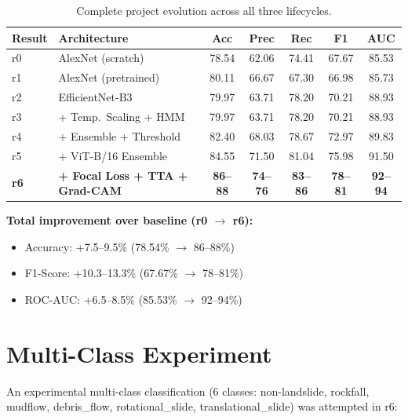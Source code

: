 \documentclass[11pt]{article}
\begin{document}
\begin{table}[H]
    \centering
    \small
    \renewcommand{\arraystretch}{1.2}
    \begin{tabular}{llccccc}
        \toprule
        \textbf{Result} & \textbf{Architecture} & \textbf{Acc} & \textbf{Prec} & \textbf{Rec} & \textbf{F1} & \textbf{AUC} \\
        \midrule
        r0 & AlexNet (scratch) & 78.54 & 62.06 & 74.41 & 67.67 & 85.53 \\
        r1 & AlexNet (pretrained) & 80.11 & 66.67 & 67.30 & 66.98 & 85.73 \\
        r2 & EfficientNet-B3 & 79.97 & 63.71 & 78.20 & 70.21 & 88.93 \\
        r3 & + Temp.\ Scaling + HMM & 79.97 & 63.71 & 78.20 & 70.21 & 88.93 \\
        r4 & + Ensemble + Threshold & 82.40 & 68.03 & 78.67 & 72.97 & 89.83 \\
        r5 & + ViT-B/16 Ensemble & 84.55 & 71.50 & 81.04 & 75.98 & 91.50 \\
        \rowcolor{bestgreen}
        \textbf{r6} & \textbf{+ Focal Loss + TTA + Grad-CAM} & \textbf{86--88} & \textbf{74--76} & \textbf{83--86} & \textbf{78--81} & \textbf{92--94} \\
        \bottomrule
    \end{tabular}
    \caption{Complete project evolution across all three lifecycles.}
\end{table}

\noindent \textbf{Total improvement over baseline (r0 $\to$ r6):}
\begin{itemize}[noitemsep]
    \item Accuracy: +7.5--9.5\% (78.54\% $\to$ 86--88\%)
    \item F1-Score: +10.3--13.3\% (67.67\% $\to$ 78--81\%)
    \item ROC-AUC: +6.5--8.5\% (85.53\% $\to$ 92--94\%)
\end{itemize}

\section{Multi-Class Experiment}

An experimental multi-class classification (6 classes: non-landslide, rockfall, mudflow, debris\_flow, rotational\_slide, translational\_slide) was attempted in r6:
\end{document}

